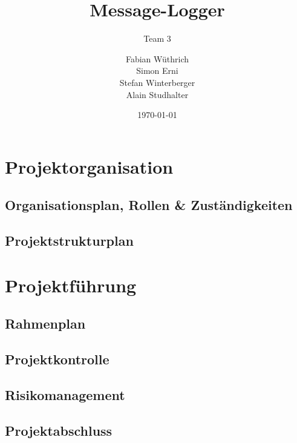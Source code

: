 \documentclass[11pt,a4paper]{scrreprt}
\begin{document}
\titlehead{Hochschule Luzern \\ 
	Technik \& Architektur}
\subject{Projektmanagementplan}
\title{Message-Logger}
\subtitle{Team 3}
\author{Fabian Wüthrich \\ 
	Simon Erni \\ 
	Stefan Winterberger \\ 
	Alain Studhalter}
\date{\today}
\publishers{Verteilte Systeme \& Komponenten}

\maketitle

\tableofcontents

\chapter{Projektorganisation}

\section{Organisationsplan, Rollen \& Zuständigkeiten}

\section{Projektstrukturplan}

\chapter{Projektführung}

\section{Rahmenplan}

\section{Projektkontrolle}

\section{Risikomanagement}

\section{Projektabschluss}
\end{document}
